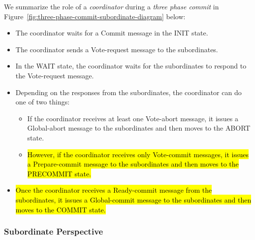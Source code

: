 \documentclass[twoside]{article}
\begin{document}
We summarize the role of a \emph{coordinator} during a \emph{three phase commit} in Figure~\ref{fig:three-phase-commit-subordinate-diagram} below:
\begin{itemize}
    \item The coordinator waits for a {\ttfamily Commit} message in the {\ttfamily INIT} state. 
    \item The coordinator sends a {\ttfamily Vote-request} message to the subordinates. 
    \item In the {\ttfamily WAIT} state, the coordinator waits for the subordinates to respond to the {\ttfamily Vote-request} message.
    \item Depending on the responses from the subordinates, the coordinator can do one of two things:
        \begin{itemize}
            \item If the coordinator receives at least one {\ttfamily Vote-abort} message, it issues a {\ttfamily Global-abort} message to the subordinates and then moves to the {\ttfamily ABORT} state.
            \item \hl{However, if the coordinator receives only {\ttfamily Vote-commit} messages, it issues a {\ttfamily Prepare-commit} message to the subordinates and then moves to the {\ttfamily PRECOMMIT} state.}
        \end{itemize} 
    \item \hl{Once the coordinator receives a {\ttfamily Ready-commit} message from the subordinates, it issues a {\ttfamily Global-commit} message  to the subordinates and then moves to the {\ttfamily COMMIT} state.}
\end{itemize}

\subsubsection{Subordinate Perspective}
\end{document}
